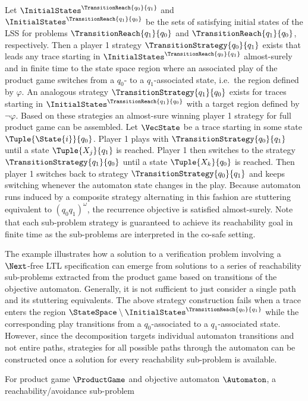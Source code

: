     Let $\InitialStates^\TransitionReach{q_0}{q_1}$ and $\InitialStates^\TransitionReach{q_1}{q_0}$ be the sets of satisfying initial states of the LSS for problems $\TransitionReach{q_1}{q_0}$ and $\TransitionReach{q_1}{q_0}$, respectively.
    Then a player 1 strategy $\TransitionStrategy{q_0}{q_1}$ exists that leads any trace starting in $\InitialStates^\TransitionReach{q_0}{q_1}$ almost-surely and in finite time to the state space region where an associated play of the product game switches from a $q_0$- to a $q_1$-associated state, i.e.\ the region defined by $\varphi$.
    An analogous strategy $\TransitionStrategy{q_1}{q_0}$ exists for traces starting in $\InitialStates^\TransitionReach{q_1}{q_0}$ with a target region defined by $\neg \varphi$.
    Based on these strategies an almost-sure winning player 1 strategy for full product game can be assembled.
    Let $\VecState$ be a trace starting in some state $\Tuple{\State{i}}{q_0}$.
    Player 1 plays with $\TransitionStrategy{q_0}{q_1}$ until a state $\Tuple{X_j}{q_1}$ is reached.
    Player 1 then switches to the strategy $\TransitionStrategy{q_1}{q_0}$ until a state $\Tuple{X_k}{q_0}$ is reached.
    Then player 1 switches back to strategy $\TransitionStrategy{q_0}{q_1}$ and keeps switching whenever the automaton state changes in the play.
    Because automaton runs induced by a composite strategy alternating in this fashion are stuttering equivalent to $(q_0 q_1)^\omega$, the recurrence objective is satisfied almost-surely.
    Note that each sub-problem strategy is guaranteed to achieve its reachability goal in finite time as the sub-problems are interpreted in the co-safe setting.

    The example illustrates how a solution to a verification problem involving a $\Next$-free LTL specification can emerge from solutions to a series of reachability sub-problems extracted from the product game based on transitions of the objective automaton.
    Generally, it is not sufficient to just consider a single path and its stuttering equivalents.
    The above strategy construction fails when a trace enters the region $\StateSpace \setminus \InitialStates^\TransitionReach{q_0}{q_1}$ while the corresponding play transitions from a $q_0$-associated to a $q_1$-associated state.
    However, since the decomposition targets individual automaton transitions and not entire paths, strategies for all possible paths through the automaton can be constructed once a solution for every reachability sub-problem is available.

    For product game $\ProductGame$ and objective automaton $\Automaton$, a reachability/avoidance sub-problem

